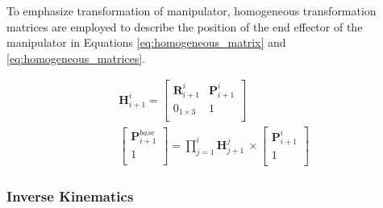 \noindent To emphasize transformation of manipulator, homogeneous transformation matrices \cite{homogeneous} are 
employed to describe the position of the end effector of the manipulator in Equations \ref{eq:homogeneous_matrix} 
and \ref{eq:homogeneous_matrices}.

\begin{align}
    &\textbf{H}_{i+1}^{i} = 
    \begin{bmatrix}
        \textbf{R}_{i+1}^{i} &  \textbf{P}_{i+1}^{i}\\
        0_{1\times3} & 1 \\
    \end{bmatrix} 
    \label{eq:homogeneous_matrix} \\
    &\begin{bmatrix}
        \textbf{P}_{i+1}^{base} \\
        1 \\
    \end{bmatrix}
    = \prod_{j=1}^{i}\textbf{H}_{j+1}^{j} \ 
    \times
    \begin{bmatrix}
        \textbf{P}_{i+1}^{i} \\
        1 \\
    \end{bmatrix} 
    \label{eq:homogeneous_matrices}
\end{align}

\subsubsection{Inverse Kinematics}


\newpage